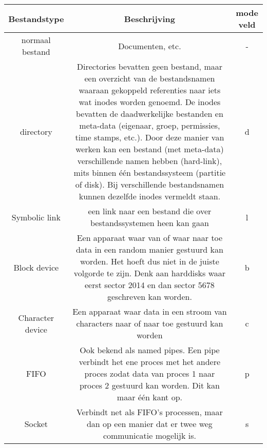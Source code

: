 \begin{center}
\begin{tabular}{ | c | c | c | }
\hline
Bestandstype & Beschrijving & mode veld \\
\hline
\hline
 normaal bestand & Documenten, etc. & - \\
\hline
 directory & Directories bevatten geen bestand, maar een overzicht van de bestandsnamen waaraan gekoppeld referenties naar iets wat inodes worden genoemd. De inodes bevatten de daadwerkelijke bestanden en meta-data (eigenaar, groep, permissies, time stamps, etc.). Door deze manier van werken kan een bestand (met meta-data) verschillende namen hebben (hard-link), mits binnen \'e\'en bestandssysteem (partitie of disk). Bij verschillende bestandsnamen kunnen dezelfde inodes vermeldt staan. & d \\
\hline
 Symbolic link & een link naar een bestand die over bestandssystemen heen kan gaan & l \\
\hline
Block device & Een apparaat waar van of waar naar toe data in een random manier gestuurd kan worden. Het hoeft dus niet in de juiste volgorde te zijn. Denk aan harddisks waar eerst sector 2014 en dan sector 5678 geschreven kan worden. & b \\
\hline
Character device & Een apparaat waar data in een stroom van characters naar of naar toe gestuurd kan worden & c \\
\hline
FIFO & Ook bekend als named pipes. Een pipe verbindt het ene proces met het andere proces zodat data van proces 1 naar proces 2 gestuurd kan worden. Dit kan maar \'e\'en kant op. & p \\
\hline
Socket & Verbindt net als FIFO's processen, maar dan op een manier dat er twee weg communicatie mogelijk is. & s \\
\hline
\end{tabular}
\end{center}

